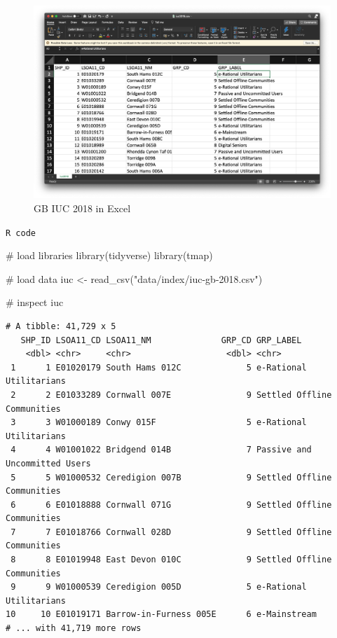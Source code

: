 \documentclass[
  letterpaper,
  DIV=11,
  numbers=noendperiod]{scrreprt}
\newenvironment{Shaded}{\begin{snugshade}}{\end{snugshade}}
\newcommand{\CommentTok}[1]{\textcolor[rgb]{0.37,0.37,0.37}{#1}}
\newcommand{\FunctionTok}[1]{\textcolor[rgb]{0.28,0.35,0.67}{#1}}
\newcommand{\NormalTok}[1]{\textcolor[rgb]{0.00,0.23,0.31}{#1}}
\newcommand{\OtherTok}[1]{\textcolor[rgb]{0.00,0.23,0.31}{#1}}
\newcommand{\StringTok}[1]{\textcolor[rgb]{0.13,0.47,0.30}{#1}}
\begin{document}
\begin{figure}

{\centering \includegraphics[width=1\textwidth,height=\textheight]{images/w07/iuc-excel.png}

}

\caption{\label{fig-geo-iuc-in-excel}GB IUC 2018 in Excel}

\end{figure}

\begin{codelisting}

\caption{\texttt{R code}}

\begin{Shaded}
\begin{Highlighting}[]
\CommentTok{\# load libraries}
\FunctionTok{library}\NormalTok{(tidyverse)}
\FunctionTok{library}\NormalTok{(tmap)}

\CommentTok{\# load data}
\NormalTok{iuc }\OtherTok{\textless{}{-}} \FunctionTok{read\_csv}\NormalTok{(}\StringTok{"data/index/iuc{-}gb{-}2018.csv"}\NormalTok{)}

\CommentTok{\# inspect}
\NormalTok{iuc}
\end{Highlighting}
\end{Shaded}

\end{codelisting}

\begin{verbatim}
# A tibble: 41,729 x 5
   SHP_ID LSOA11_CD LSOA11_NM              GRP_CD GRP_LABEL                    
    <dbl> <chr>     <chr>                   <dbl> <chr>                        
 1      1 E01020179 South Hams 012C             5 e-Rational Utilitarians      
 2      2 E01033289 Cornwall 007E               9 Settled Offline Communities  
 3      3 W01000189 Conwy 015F                  5 e-Rational Utilitarians      
 4      4 W01001022 Bridgend 014B               7 Passive and Uncommitted Users
 5      5 W01000532 Ceredigion 007B             9 Settled Offline Communities  
 6      6 E01018888 Cornwall 071G               9 Settled Offline Communities  
 7      7 E01018766 Cornwall 028D               9 Settled Offline Communities  
 8      8 E01019948 East Devon 010C             9 Settled Offline Communities  
 9      9 W01000539 Ceredigion 005D             5 e-Rational Utilitarians      
10     10 E01019171 Barrow-in-Furness 005E      6 e-Mainstream                 
# ... with 41,719 more rows
\end{verbatim}
\end{document}
